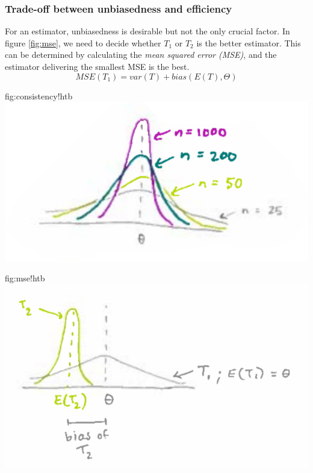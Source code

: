 	\subsubsection{Trade-off between unbiasedness and efficiency}
		For an estimator, unbiasedness is desirable but not the only crucial factor. In figure \ref{fig:mse}, we need to decide whether $T_1$ or $T_2$ is the better estimator. This can be determined by calculating the \emph{mean squared error (MSE)}, and the estimator delivering the smallest MSE is the best.
		\begin{equation*}
			MSE(T_1)=var(T)+bias\left(E(T),\Theta\right)
		\end{equation*}
		\begin{fig}{fig:consistency}{!htb}
			\includegraphics[width=\textwidth,trim={0cm 0cm 0.5cm .5cm},clip]{P09Consistency.png}
		\end{fig}			
		\begin{fig}{fig:mse}{!htb}
			\includegraphics[width=\textwidth]{P10mse.png}
		\end{fig}			
